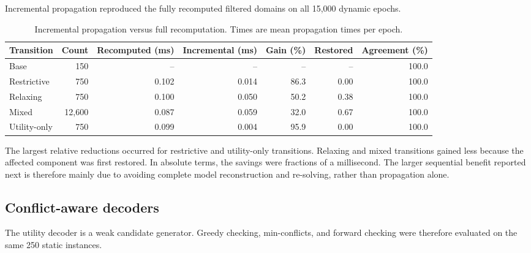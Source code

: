 \documentclass[pdflatex,sn-mathphys-num,iicol,oneside]{sn-jnl}
\begin{document}
Incremental propagation reproduced the fully recomputed filtered
domains on all 15{,}000 dynamic epochs.

\begin{table}[t]
\centering
\caption{
Incremental propagation versus full recomputation. Times are mean
propagation times per epoch.
}
\label{tab:incremental-results}
\setlength{\tabcolsep}{4pt}
\small

\begin{tabular}{lrrrrrr}
\toprule
Transition &
Count &
Recomputed (ms) &
Incremental (ms) &
Gain (\%) &
Restored &
Agreement (\%)\\
\midrule

Base
& 150 & -- & -- & -- & -- & 100.0\\

Restrictive
& 750 & 0.102 & 0.014 & 86.3 & 0.00 & 100.0\\

Relaxing
& 750 & 0.100 & 0.050 & 50.2 & 0.38 & 100.0\\

Mixed
& 12{,}600 & 0.087 & 0.059 & 32.0 & 0.67 & 100.0\\

Utility-only
& 750 & 0.099 & 0.004 & 95.9 & 0.00 & 100.0\\

\bottomrule
\end{tabular}
\normalsize
\end{table}

The largest relative reductions occurred for restrictive and
utility-only transitions. Relaxing and mixed transitions gained less
because the affected component was first restored. In absolute terms,
the savings were fractions of a millisecond. The larger sequential
benefit reported next is therefore mainly due to avoiding complete
model reconstruction and re-solving, rather than propagation alone.

\subsection{Conflict-aware decoders}
\label{sec:decoder-baselines}

The utility decoder is a weak candidate generator. Greedy checking,
min-conflicts, and forward checking were therefore evaluated on the
same 250 static instances.
\end{document}
